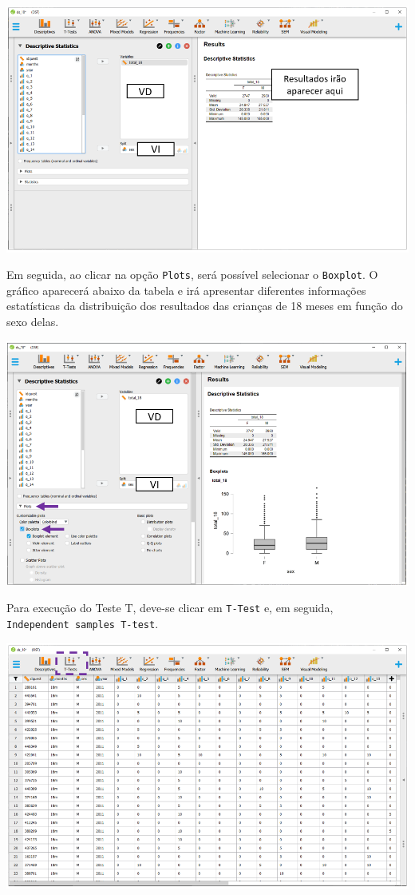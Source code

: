 \documentclass[
]{book}
\begin{document}
\includegraphics{./img/cap_testet_tabela_descritiva.png}

Em seguida, ao clicar na opção \texttt{Plots}, será possível selecionar o \texttt{Boxplot}. O gráfico aparecerá abaixo da tabela e irá apresentar diferentes informações estatísticas da distribuição dos resultados das crianças de 18 meses em função do sexo delas.

\includegraphics{./img/cap_testet_tabela.png}

Para execução do Teste T, deve-se clicar em \texttt{T-Test} e, em seguida, \texttt{Independent\ samples\ T-test}.

\includegraphics{./img/cap_testet_interface1.png}
\end{document}
